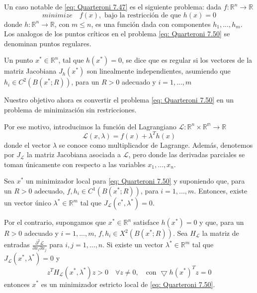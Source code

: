 Un caso notable de \ref{eq: Quarteroni 7.47} es el siguiente problema: dada $f: \mathbb{R}^n \rightarrow \mathbb{R}$
\begin{equation}
    \label{eq: Quarteroni 7.50}
    minimize \quad f(x), \text{ bajo la restricción de que } h(x) = 0
\end{equation}
donde $h: \mathbb{R}^n \rightarrow \mathbb{R}$, con $m \leq n$, es una función dada con componentes $h_1, ..., h_m$. Los analogos de los puntos críticos en el problema \ref{eq: Quarteroni 7.50} se denominan puntos regulares.

\begin{definition}
    Un punto $x^* \in \mathbb{R}^n$, tal que $h(x^*) = 0$, se dice que es regular si los vectores de la matriz Jacobiana $J_h(x^*)$ son linealmente independientes, asumiendo que $h_i \in C^2(B(x^*; R))$, para un $R > 0$ adecuado y $i = 1,..., m$
\end{definition}

Nuestro objetivo ahora es convertir el problema \ref{eq: Quarteroni 7.50} en un problema de minimización sin restricciones. %

Por ese motivo, introducimos la función del Lagrangiano $\mathcal{L} : \mathbb{R}^n \times \mathbb{R^m} \rightarrow \mathbb{R}$
\[ \mathcal{L}(x, \lambda) = f(x) + \lambda^T h(x) \]
donde el vector $\lambda$ se conoce como multiplicador de Lagrange. Además, denotemos por $J_\mathcal{L}$ la matriz Jacobiana asociada a $\mathcal{L}$, pero donde las derivadas parciales se toman únicamente con respecto a las variables $x_1, ..., x_n$.

\begin{property}
    Sea $x^*$ un minimizador local para \ref{eq: Quarteroni 7.50} y suponiendo que, para un $R > 0$ adecuado, $f, h_i \in C^1(B(x^*; R))$, para $i = 1,...,m$. Entonces, existe un vector único $\lambda^* \in \mathbb{R}^m$ tal que $J_\mathcal{L} (c^*, \lambda^*) = 0$.

    Por el contrario, supongamos que $x^* \in \mathbb{R}^n$ satisface $h(x^*) = 0$ y que, para un $R > 0$ adecuado y $i = 1, ..., m$, $f, h_i \in X^2(B(x^*; R))$. Sea $H_\mathcal{L}$ la matriz de entradas $\frac{\partial^2 \mathcal{L}}{\partial x_i \partial x_j}$ para $i, j = 1,..., n$. Si existe un vector $\lambda^* \in \mathbb{R}^m$ tal que $J_\mathcal{L}(x^*, \lambda^*) = 0$ y 
    \[ z^T H_\mathcal{L}(x^*, \lambda^*) z > 0 \quad \forall z \neq 0, \quad \text{con } \bigtriangledown h(x^*)^T z = 0\]
    entonces $x^*$ es un minimizador estricto local de \ref{eq: Quarteroni 7.50}.
\end{property}

